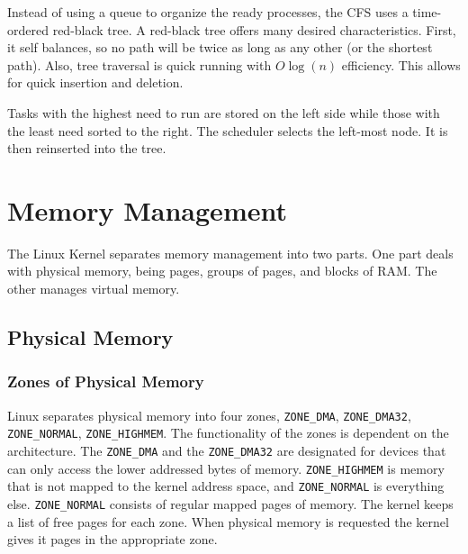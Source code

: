 \documentclass[12pt]{article}
\begin{document}
Instead of using a queue to organize the ready processes, the CFS uses a time-ordered red-black tree. A red-black tree offers many desired characteristics. First, it self balances, so no path will be twice as long as any other (or the shortest path). Also, tree traversal is quick running with $O\log(n)$ efficiency. This allows for quick insertion and deletion.

Tasks with the highest need to run are stored on the left side while those with the least need sorted to the right. The scheduler selects the left-most node. It is then reinserted into the tree.


\section{Memory Management}

The Linux Kernel separates memory management into two parts. One part deals with physical memory, being pages, groups of pages, and blocks of RAM. The other manages virtual memory.

\subsection{Physical Memory}

\subsubsection{Zones of Physical Memory}
Linux separates physical memory into four zones, \lstinline|ZONE_DMA|, \lstinline|ZONE_DMA32|, \lstinline|ZONE_NORMAL|, \lstinline|ZONE_HIGHMEM|. The functionality of the zones is dependent on the architecture. The \lstinline|ZONE_DMA| and the \lstinline|ZONE_DMA32| are designated for devices that can only access the lower addressed bytes of memory. \lstinline|ZONE_HIGHMEM| is memory that is not mapped to the kernel address space, and \lstinline|ZONE_NORMAL| is everything else. \lstinline|ZONE_NORMAL| consists of regular mapped pages of memory. The kernel keeps a list of free pages for each zone. When physical memory is requested the kernel gives it pages in the appropriate zone.
\end{document}
